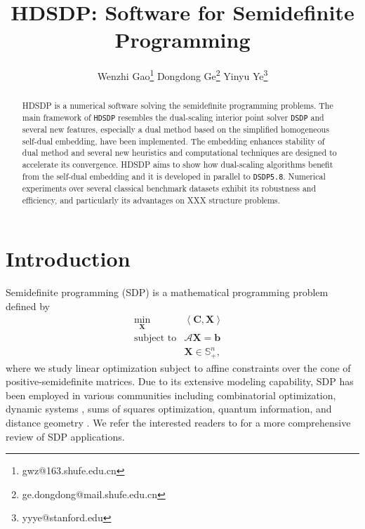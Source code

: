 \documentclass[10pt]{article}
\begin{document}
\title{HDSDP: Software for Semidefinite Programming}

\author{Wenzhi Gao\thanks{gwz@163.shufe.edu.cn} \quad Dongdong Ge\thanks{ge.dongdong@mail.shufe.edu.cn} \quad Yinyu Ye\thanks{yyye@stanford.edu}}
\maketitle

\begin{abstract}
  HDSDP is a numerical software solving the semidefinite
  programming problems. The main framework of {{\texttt{HDSDP}}} resembles the dual-scaling
  interior point solver {{\texttt{DSDP}}}{\cite{benson2008algorithm}} and several new
  features, especially a dual method based on the simplified homogeneous
  self-dual embedding, have been implemented. The embedding enhances stability of dual method 
  and several new heuristics and computational techniques are designed to accelerate its
  convergence. HDSDP aims to show how dual-scaling algorithms benefit from the
  self-dual embedding and it is developed in parallel to {{{\texttt{DSDP5.8}}}}.
  Numerical experiments over several classical benchmark datasets exhibit its
  robustness and efficiency, and particularly its advantages on XXX structure problems.
\end{abstract}
\section{Introduction}

Semidefinite programming (SDP) is a mathematical programming problem defined
by
\begin{eqnarray}
  \min_{\mathbf{X}} & \left\langle \mathbf{C}, \mathbf{X} \right\rangle & \nonumber \\
  \text{subject to} & \mathcal{A} \mathbf{X} = \mathbf{b} & \\ 
  & \mathbf{X} \in \mathbb{S}_+^n, & \nonumber
\end{eqnarray}
where we study linear optimization subject to affine constraints over the cone of
positive-semidefinite matrices. Due to its extensive modeling capability, SDP
has been employed in various communities including combinatorial
optimization{\cite{goemans1995improved, laurent2005semidefinite}},
dynamic systems {\cite{vandenberghe1996semidefinite}}, sums of squares
optimization{\cite{laurent2009sums}}, quantum
information{\cite{hayashi2016quantum}}, and distance geometry
{\cite{biswas2004semidefinite, so2007theory}}. We refer the interested
readers to {\cite{wolkowicz2005semidefinite}} for a more comprehensive review
of SDP applications. \\
\end{document}
